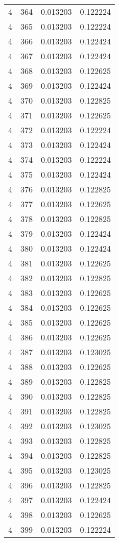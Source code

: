 \begin{longtable}{rrrr}
4 & 364 & 0.013203 & 0.122224 \\
4 & 365 & 0.013203 & 0.122224 \\
4 & 366 & 0.013203 & 0.122424 \\
4 & 367 & 0.013203 & 0.122424 \\
4 & 368 & 0.013203 & 0.122625 \\
4 & 369 & 0.013203 & 0.122424 \\
4 & 370 & 0.013203 & 0.122825 \\
4 & 371 & 0.013203 & 0.122625 \\
4 & 372 & 0.013203 & 0.122224 \\
4 & 373 & 0.013203 & 0.122424 \\
4 & 374 & 0.013203 & 0.122224 \\
4 & 375 & 0.013203 & 0.122424 \\
4 & 376 & 0.013203 & 0.122825 \\
4 & 377 & 0.013203 & 0.122625 \\
4 & 378 & 0.013203 & 0.122825 \\
4 & 379 & 0.013203 & 0.122424 \\
4 & 380 & 0.013203 & 0.122424 \\
4 & 381 & 0.013203 & 0.122625 \\
4 & 382 & 0.013203 & 0.122825 \\
4 & 383 & 0.013203 & 0.122625 \\
4 & 384 & 0.013203 & 0.122625 \\
4 & 385 & 0.013203 & 0.122625 \\
4 & 386 & 0.013203 & 0.122625 \\
4 & 387 & 0.013203 & 0.123025 \\
4 & 388 & 0.013203 & 0.122625 \\
4 & 389 & 0.013203 & 0.122825 \\
4 & 390 & 0.013203 & 0.122825 \\
4 & 391 & 0.013203 & 0.122825 \\
4 & 392 & 0.013203 & 0.123025 \\
4 & 393 & 0.013203 & 0.122825 \\
4 & 394 & 0.013203 & 0.122825 \\
4 & 395 & 0.013203 & 0.123025 \\
4 & 396 & 0.013203 & 0.122825 \\
4 & 397 & 0.013203 & 0.122424 \\
4 & 398 & 0.013203 & 0.122625 \\
4 & 399 & 0.013203 & 0.122224 \\

\end{longtable}
